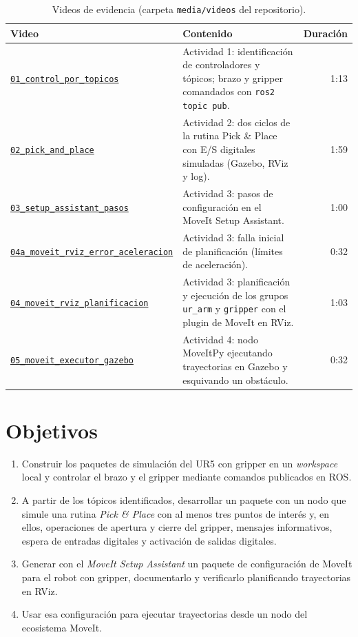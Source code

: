 \documentclass[11pt,letterpaper]{article}
\newcommand{\repo}{https://github.com/chaconsantiago966-create/ur5_ros2_moveit_lab}
\newcommand{\repoblob}{\repo/blob/main}
\begin{document}
\begin{table}[H]
\centering
\caption{Videos de evidencia (carpeta \texttt{media/videos} del repositorio).}
\label{tab:videos}
\begin{tabularx}{\linewidth}{@{}l X r@{}}
\toprule
Video & Contenido & Duración \\
\midrule
\href{\repoblob/media/videos/01_control_por_topicos.mp4}{\texttt{01\_control\_por\_topicos}} & Actividad 1: identificación de controladores y tópicos; brazo y gripper comandados con \texttt{ros2 topic pub}. & 1:13 \\
\href{\repoblob/media/videos/02_pick_and_place.mp4}{\texttt{02\_pick\_and\_place}} & Actividad 2: dos ciclos de la rutina Pick \& Place con E/S digitales simuladas (Gazebo, RViz y log). & 1:59 \\
\href{\repoblob/media/videos/03_setup_assistant_pasos.mp4}{\texttt{03\_setup\_assistant\_pasos}} & Actividad 3: pasos de configuración en el MoveIt Setup Assistant. & 1:00 \\
\href{\repoblob/media/videos/04a_moveit_rviz_error_aceleracion.mp4}{\texttt{04a\_moveit\_rviz\_error\_aceleracion}} & Actividad 3: falla inicial de planificación (límites de aceleración). & 0:32 \\
\href{\repoblob/media/videos/04_moveit_rviz_planificacion.mp4}{\texttt{04\_moveit\_rviz\_planificacion}} & Actividad 3: planificación y ejecución de los grupos \texttt{ur\_arm} y \texttt{gripper} con el plugin de MoveIt en RViz. & 1:03 \\
\href{\repoblob/media/videos/05_moveit_executor_gazebo.mp4}{\texttt{05\_moveit\_executor\_gazebo}} & Actividad 4: nodo MoveItPy ejecutando trayectorias en Gazebo y esquivando un obstáculo. & 0:32 \\
\bottomrule
\end{tabularx}
\end{table}

\section{Objetivos}

\begin{enumerate}[leftmargin=*]
  \item Construir los paquetes de simulación del UR5 con gripper en un \emph{workspace} local y controlar el brazo y el gripper mediante comandos publicados en ROS.
  \item A partir de los tópicos identificados, desarrollar un paquete con un nodo que simule una rutina \emph{Pick \& Place} con al menos tres puntos de interés y, en ellos, operaciones de apertura y cierre del gripper, mensajes informativos, espera de entradas digitales y activación de salidas digitales.
  \item Generar con el \emph{MoveIt Setup Assistant} un paquete de configuración de MoveIt para el robot con gripper, documentarlo y verificarlo planificando trayectorias en RViz.
  \item Usar esa configuración para ejecutar trayectorias desde un nodo del ecosistema MoveIt.
\end{enumerate}
\end{document}
